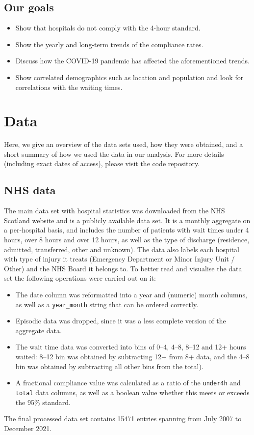 \documentclass[12pt,a4paper]{article}
\def\code#1{\texttt{#1}}
\begin{document}
\subsection{Our goals} 

\begin{itemize}
    \item Show that hospitals do not comply with the 4-hour standard.
    \item Show the yearly and long-term trends of the compliance rates.
    \item Discuss how the COVID-19 pandemic has affected the aforementioned trends.
    \item Show correlated demographics such as location and population and look for correlations with the waiting times.
\end{itemize}

\newpage

\section{Data}

Here, we give an overview of the data sets used, how they were obtained, and a short summary of how we used the data in our analysis. For more details (including exact dates of access), please visit the code repository.\cite{code}

\subsection{NHS data}

The main data set with hospital statistics was downloaded from the NHS Scotland website and is a publicly available data set.\cite{nhs_data} It is a monthly aggregate on a per-hospital basis, and includes the number of patients with wait times under 4 hours, over 8 hours and over 12 hours, as well as the type of discharge (residence, admitted, transferred, other and unknown). The data also labels each hospital with type of injury it treats (Emergency Department or Minor Injury Unit / Other) and the NHS Board it belongs to. To better read and visualise the data set the following operations were carried out on it:
\begin{itemize}
    \item The date column was reformatted into a year and (numeric) month columns, as well as a \code{year\_month} string that can be ordered correctly.
    \item Episodic data was dropped, since it was a less complete version of the aggregate data.
    \item The wait time data was converted into bins of 0--4, 4--8, 8--12 and 12+ hours waited: 8--12 bin was obtained by subtracting 12+ from 8+ data, and the 4--8 bin was obtained by subtracting all other bins from the total).
    \item A fractional compliance value was calculated as a ratio of the \code{under4h} and \code{total} data columns, as well as a boolean value whether this meets or exceeds the 95\% standard. 
\end{itemize}
The final processed data set contains 15471 entries spanning from July 2007 to December 2021.
\end{document}

